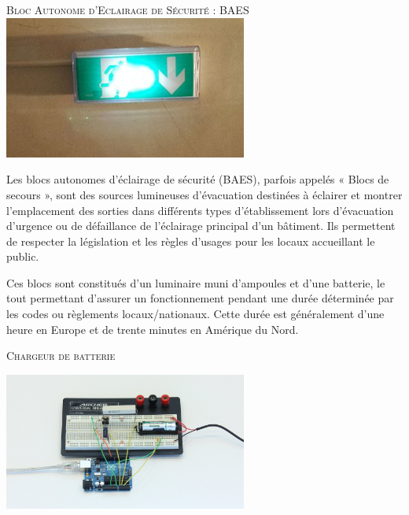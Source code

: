 \documentclass[a4paper, 11pt]{article}           %
\begin{document}
\sffamily


\begin{center}
\textsc{Bloc Autonome d'Eclairage de Sécurité : BAES}\\
\includegraphics[width=0.6\textwidth]{BAES}
\end{center}
Les blocs autonomes d'éclairage de sécurité (BAES), parfois appelés « Blocs de secours », sont des sources lumineuses d'évacuation destinées à éclairer et montrer l'emplacement des sorties dans différents types d'établissement lors d'évacuation d'urgence ou de défaillance de l'éclairage principal d'un bâtiment. Ils permettent de respecter la législation et les règles d'usages pour les locaux accueillant le public.

Ces blocs sont constitués d'un luminaire muni d'ampoules et d'une batterie, le tout permettant d'assurer un fonctionnement pendant une durée déterminée par les codes ou règlements locaux/nationaux. Cette durée est généralement d'une heure en Europe et de trente minutes en Amérique du Nord.

\textsc{Chargeur de batterie}\\

\begin{center}
\includegraphics[width=0.6\textwidth]{chargeur_realisation}
\end{center}
\end{document}
